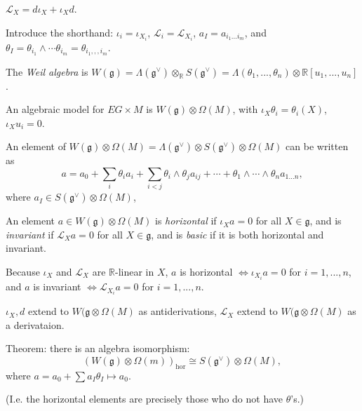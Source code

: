 \documentclass{article}
\theoremstyle{mystyle}
\theoremstyle{remark}
\numberwithin{equation}{section}
\begin{document}
$\mathcal{L}_X = d\iota_X+\iota_Xd$. 




Introduce the shorthand: $\iota_i = \iota_{X_i}$, $\mathcal{L}_i = \mathcal{L}_{X_i}$, $a_I = a_{i_1...i_m}$, and $\theta_I = \theta_{i_1}\wedge \cdots \theta_{i_m} = \theta_{i_1,,,i_m}$.

 
 
The \emph{Weil algebra} is $W(\mathfrak{g}) = \Lambda(\mathfrak{g}^\vee)\otimes_{\mathbb{R}} S(\mathfrak{g}^\vee) = \Lambda(\theta_1,...,\theta_n)\otimes \mathbb{R}[u_1,...,u_n]$.


An algebraic model for $EG\times M$ is $W(\mathfrak{g})\otimes \Omega(M)$, with 
$\iota_X\theta_i = \theta_i(X)$, $\iota_X u_i=0$.




An element of $W(\mathfrak{g})\otimes \Omega(M) = \Lambda(\mathfrak{g}^\vee)\otimes S(\mathfrak{g}^\vee)\otimes \Omega(M)$ can be written as
$$a = a_0 + \sum_i \theta_ia_i  + \sum_{i<j}\theta_i\wedge \theta_j
a_{ij}+\cdots + \theta_1\wedge \cdots \wedge \theta_n a_{1...n},$$
where $a_I\in S(\mathfrak{g}^\vee)\otimes \Omega(M)$, 

An element $a \in W(\mathfrak{g})\otimes \Omega(M)$ is \emph{horizontal} if $\iota_Xa=0$ for all $X \in \mathfrak{g}$, and is \emph{invariant} if $\mathcal{L}_X a = 0$ for all $X \in \mathfrak{g}$, and is \emph{basic} if it is both horizontal and invariant.

Because $\iota_X$ and $\mathcal{L}_X$ are $\mathbb{R}$-linear in $X$, $a$ is horizontal $\Leftrightarrow \iota_{X_i}a=0$ for $i=1,...,n$, and $a$ is invariant $\Leftrightarrow \mathcal{L}_{X_i} a=0$ for $i=1,...,n$. 




$\iota_X,d$ extend to $W(\mathfrak{g}\otimes \Omega(M)$ as antiderivations, $\mathcal{L}_X$ extend to $W(\mathfrak{g}\otimes \Omega(M)$ as a derivataion.

 
Theorem: there is an algebra isomorphism: 
$$
\left(W(\mathfrak{g})\otimes \Omega(m)\right)_{\text{hor}} \cong
S(\mathfrak{g}^\vee) \otimes \Omega(M),
$$ where $a = a_0 + \sum a_I \theta_I\mapsto a_0$. 

(I.e. the horizontal elements are precisely those who do not have $\theta$'s.)
\end{document}
